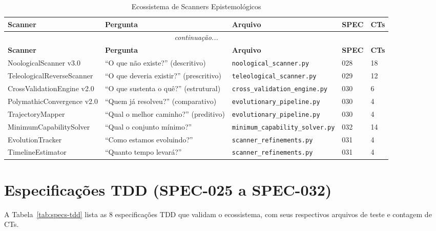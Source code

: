 \begin{longtable}{p{3cm}p{3.5cm}p{3cm}p{2cm}p{2cm}}
\caption{Ecossistema de Scanners Epistemológicos}
\label{tab:scanners-apendice}
\toprule
\textbf{Scanner} & \textbf{Pergunta} & \textbf{Arquivo} & \textbf{SPEC} & \textbf{CTs} \\
\midrule
\endfirsthead
\multicolumn{5}{c}{\textit{continuação...}} \\
\toprule
\textbf{Scanner} & \textbf{Pergunta} & \textbf{Arquivo} & \textbf{SPEC} & \textbf{CTs} \\
\midrule
\endhead
NoologicalScanner v3.0 & ``O que não existe?'' (descritivo) & \texttt{noological\_scanner.py} & 028 & 18 \\
TeleologicalReverseScanner & ``O que deveria existir?'' (prescritivo) & \texttt{teleological\_scanner.py} & 029 & 12 \\
CrossValidationEngine v2.0 & ``O que sustenta o quê?'' (estrutural) & \texttt{cross\_validation\_engine.py} & 030 & 6 \\
PolymathicConvergence v2.0 & ``Quem já resolveu?'' (comparativo) & \texttt{evolutionary\_pipeline.py} & 030 & 4 \\
TrajectoryMapper & ``Qual o melhor caminho?'' (preditivo) & \texttt{evolutionary\_pipeline.py} & 030 & 4 \\
MinimumCapabilitySolver & ``Qual o conjunto mínimo?'' & \texttt{minimum\_capability\_solver.py} & 032 & 14 \\
EvolutionTracker & ``Como estamos evoluindo?'' & \texttt{scanner\_refinements.py} & 031 & 4 \\
TimelineEstimator & ``Quanto tempo levará?'' & \texttt{scanner\_refinements.py} & 031 & 4 \\
\bottomrule
\end{longtable}

\section{Especificações TDD (SPEC-025 a SPEC-032)}

A Tabela~\ref{tab:specs-tdd} lista as 8 especificações TDD que validam o ecossistema, com seus respectivos arquivos de teste e contagem de CTs.

